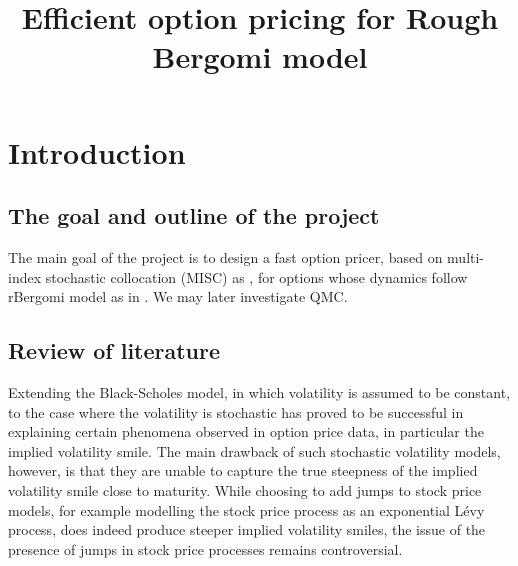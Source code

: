 \documentclass[11pt]{article}
\title{Efficient option pricing for Rough Bergomi model}
\date{ }
\begin{document}
\maketitle

\section{Introduction}
\subsection{The goal and outline of the project}
The main goal of the project is to design a fast option pricer, based on multi-index stochastic collocation (MISC) as \cite{haji2016multi}, for options whose dynamics follow rBergomi model as in \cite{bayer2016pricing}. We may later investigate QMC.

\subsection{Review of literature}
Extending the Black-Scholes model, in which volatility is assumed to be constant, to the case where the volatility is stochastic has proved to be successful in explaining certain phenomena observed in option price data, in particular the implied volatility smile. The main drawback of such stochastic volatility models, however, is that they are unable to capture the true steepness of the implied volatility smile close to maturity. 
While choosing to add jumps to stock price models, for example modelling the stock price process as an exponential L\'evy process, does indeed produce steeper implied volatility smiles, the issue of the presence of jumps in stock price processes remains controversial\cite{bajgrowicz2015jumps,christensen2014fact}.
\end{document}
